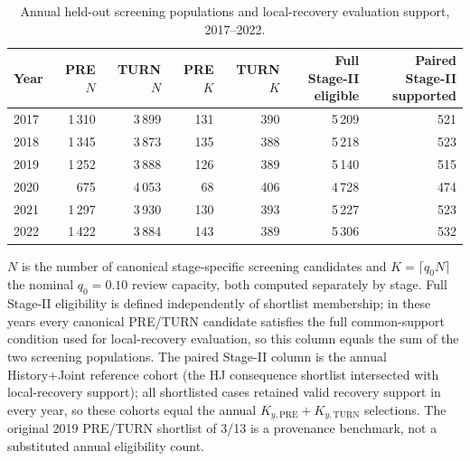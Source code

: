 \begin{table}[pos=t]
\centering
\caption{Annual held-out screening populations and local-recovery evaluation support, 2017--2022.}
\label{tab:annual_evaluation_support}
\scriptsize
\setlength{\tabcolsep}{3pt}
\begin{tabular}{lrrrrrr}
\toprule
Year & \shortstack{PRE\\$N$} & \shortstack{TURN\\$N$} & \shortstack{PRE\\$K$} & \shortstack{TURN\\$K$} & \shortstack{Full Stage-II\\eligible} & \shortstack{Paired Stage-II\\supported} \\
\midrule
2017 & 1\,310 & 3\,899 & 131 & 390 & 5\,209 & 521 \\
2018 & 1\,345 & 3\,873 & 135 & 388 & 5\,218 & 523 \\
2019 & 1\,252 & 3\,888 & 126 & 389 & 5\,140 & 515 \\
2020 & 675 & 4\,053 & 68 & 406 & 4\,728 & 474 \\
2021 & 1\,297 & 3\,930 & 130 & 393 & 5\,227 & 523 \\
2022 & 1\,422 & 3\,884 & 143 & 389 & 5\,306 & 532 \\
\bottomrule
\end{tabular}
\par\vspace{3pt}
\begin{minipage}{0.98\linewidth}
\footnotesize
$N$ is the number of canonical stage-specific screening candidates and $K=\lceil q_0N\rceil$ the nominal $q_0=0.10$ review capacity, both computed separately by stage. Full Stage-II eligibility is defined independently of shortlist membership; in these years every canonical PRE/TURN candidate satisfies the full common-support condition used for local-recovery evaluation, so this column equals the sum of the two screening populations. The paired Stage-II column is the annual History+Joint reference cohort (the HJ consequence shortlist intersected with local-recovery support); all shortlisted cases retained valid recovery support in every year, so these cohorts equal the annual $K_{y,\mathrm{PRE}}+K_{y,\mathrm{TURN}}$ selections. The original 2019 PRE/TURN shortlist of 3/13 is a provenance benchmark, not a substituted annual eligibility count.
\end{minipage}
\end{table}

